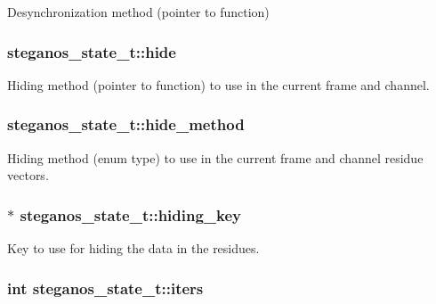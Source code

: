 \label{structsteganos__state__t_a038d9b8c4d75e1e2cf047b0d89e7a07a}
Desynchronization method (pointer to function) \hypertarget{structsteganos__state__t_a8f4d58596c9f13fabefc97efb5d2d301}{
\subsubsection[{hide}]{ {\bf steganos\_\-state\_\-t::hide}}}
\label{structsteganos__state__t_a8f4d58596c9f13fabefc97efb5d2d301}
Hiding method (pointer to function) to use in the current frame and channel. \hypertarget{structsteganos__state__t_ad48f948c5024ec76b3a9bece54124d66}{
\subsubsection[{hide\_\-method}]{ {\bf steganos\_\-state\_\-t::hide\_\-method}}}
\label{structsteganos__state__t_ad48f948c5024ec76b3a9bece54124d66}
Hiding method (enum type) to use in the current frame and channel residue vectors. \hypertarget{structsteganos__state__t_a962efb329a129c32e8a1a08731bd81ba}{
\subsubsection[{hiding\_\-key}]{$\ast$ {\bf steganos\_\-state\_\-t::hiding\_\-key}}}
\label{structsteganos__state__t_a962efb329a129c32e8a1a08731bd81ba}
Key to use for hiding the data in the residues. \hypertarget{structsteganos__state__t_aa220ce82394bee0330d0de96586a9f38}{
\subsubsection[{iters}]{\setlength{\rightskip}{0pt plus 5cm}int {\bf steganos\_\-state\_\-t::iters}}}
\label{structsteganos__state__t_aa220ce82394bee0330d0de96586a9f38}
